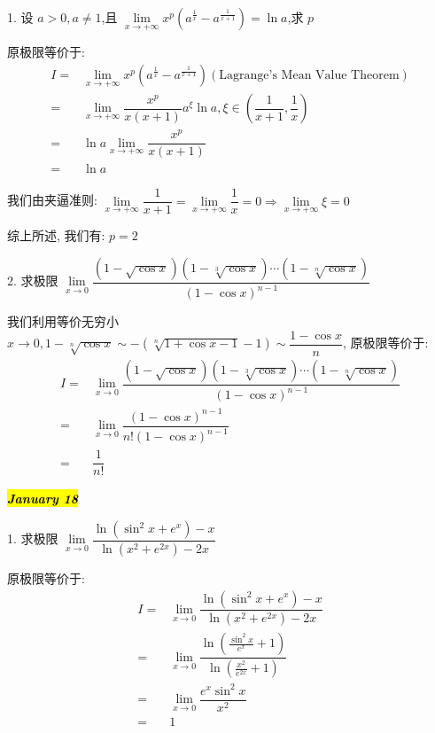 1. 设 $a>0,a\neq 1$,且 $\lim\limits_{x\to +\infty}x^{p}(a^{\frac{1}{x}}-a^{\frac{1}{x+1}})=\ln a$,求 $p$
\begin{solution}

	原极限等价于:
	\begin{align*}
		I = & \lim\limits_{x\to +\infty}x^{p}(a^{\frac{1}{x}}-a^{\frac{1}{x+1}})(\text{Lagrange's Mean Value Theorem})\\
		  = & \lim\limits_{x\to +\infty}\dfrac{x^{p}}{x(x+1)}a^{\xi}\ln a, \xi\in(\dfrac{1}{x+1},\dfrac{1}{x})\\
		  = & \ln a\lim\limits_{x\to +\infty}\dfrac{x^{p}}{x(x+1)}\\
		  = & \ln a
	\end{align*}

	我们由夹逼准则: $\lim\limits_{x\to +\infty} \dfrac{1}{x+1} =\lim\limits_{x\to +\infty} \dfrac{1}{x} = 0\Rightarrow \lim\limits_{x\to +\infty} \xi =0$

	综上所述, 我们有: $p = 2$
\end{solution}

2. 求极限 $\lim\limits_{x\to 0}\dfrac{(1-\sqrt{\cos x})(1-\sqrt[3]{\cos x})\cdots(1-\sqrt[n]{\cos x})}{(1-\cos x)^{n-1}}$
\begin{solution}
	
	我们利用等价无穷小 $x\to 0, 1- \sqrt[n]{\cos x}\sim -(\sqrt[n]{1+\cos x-1}-1)\sim \dfrac{1-\cos x}{n}$, 原极限等价于:
	\begin{align*}
		I = & \lim\limits_{x\to 0}\dfrac{(1-\sqrt{\cos x})(1-\sqrt[3]{\cos x})\cdots(1-\sqrt[n]{\cos x})}{(1-\cos x)^{n-1}}\\
		  = & \lim\limits_{x\to 0}\dfrac{(1-\cos x)^{n-1}}{n!(1-\cos x)^{n-1}}\\
		  = & \dfrac{1}{n!}
	\end{align*}
\end{solution}
\hl{\textbf{\textit{January 18}}}

1. 求极限 $\lim\limits_{x\to 0}\dfrac{\ln(\sin^{2}x+e^{x})-x}{\ln(x^{2}+e^{2x})-2x}$
\begin{solution}
	
	原极限等价于:
	\begin{align*}
		I = & \lim\limits_{x\to 0}\dfrac{\ln(\sin^{2}x+e^{x})-x}{\ln(x^{2}+e^{2x})-2x}\\
		  = & \lim\limits_{x\to 0}\dfrac{\ln(\frac{\sin^{2}x}{e^{x}}+1)}{\ln(\frac{x^{2}}{e^{2x}}+1)}\\
		  = & \lim\limits_{x\to 0}\dfrac{e^{x}\sin^{2}x}{x^{2}}\\
		  = & 1
	\end{align*}
\end{solution}

